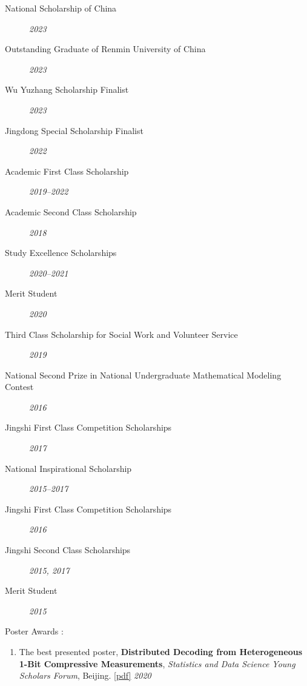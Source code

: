 \documentclass[margin,line]{resume-bib}
\begin{document}
\begin{resume}
\begin{description}
        \item[National Scholarship of China]   
        \hfill \textsl{2023} 
        \item[Outstanding Graduate of Renmin University of China]
        \hfill \textsl{2023} 
        \item[Wu Yuzhang Scholarship Finalist]
        \hfill \textsl{2023} 
        \item[Jingdong Special Scholarship Finalist]
        \hfill \textsl{2022} 
        \item[Academic First Class Scholarship]   
        \hfill \textsl{2019--2022} 
        \item[Academic Second Class Scholarship]   
        \hfill \textsl{2018} 
        \item[Study Excellence Scholarships]   
        \hfill \textsl{2020--2021} 
        \item[Merit Student]   
        \hfill \textsl{2020}
        \item[Third Class Scholarship for Social Work and Volunteer Service]   
        \hfill \textsl{2019}%
        \item[National Second Prize in {\small National Undergraduate Mathematical Modeling Contest}]   
        \hfill \textsl{2016} 
        \item[Jingshi First Class Competition Scholarships]   
        \hfill \textsl{2017} 
        \item[National Inspirational Scholarship]   
        \hfill \textsl{2015--2017} 
        \item[Jingshi First Class Competition Scholarships]   
        \hfill \textsl{2016} 
        \item[Jingshi Second Class Scholarships]   
        \hfill \textsl{2015, 2017} 
        \item[Merit Student]   
        \hfill \textsl{2015} 

        \item[Poster Awards $\!:$]  
\end{description}
\begin{enumerate}
    \item The best presented poster, {\textbf{Distributed Decoding from Heterogeneous 1-Bit Compressive Measurements}}, \textsl{Statistics and Data Science Young Scholars Forum}, Beijing. \href{https://canyi-chen.github.io/static/Poster/1bit.pdf}{[pdf]} \hfill \textsl{2020}
\end{enumerate}


\end{resume}
\end{document}
